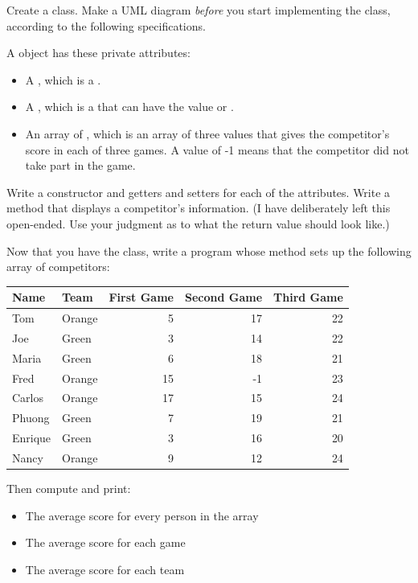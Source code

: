 \begin{exercise}
Create a  class. Make a UML diagram {\em before} you start implementing the class, according to the following specifications.

A  object has these private attributes:

\begin{itemize}
\item A , which is a .
\item A , which is a  that can have the value  or .
\item An array of , which is an array of three  values that gives the competitor's score in each of three games. A value of -1 means that the competitor did not take part in the game.
\end{itemize}

Write a constructor and getters and setters for each of the attributes. Write a  method that displays a competitor's information. (I have deliberately left this open-ended. Use your judgment as to what the return value should look like.)

Now that you have the  class, write a program whose  method sets up the following array of competitors:

\begin{tabular}{|l|l|r|r|r|}
\hline
Name & Team & First Game & Second Game & Third Game \\ \hline
Tom & Orange & 5 & 17 & 22 \\ \hline
Joe & Green & 3 & 14 & 22 \\ \hline
Maria & Green & 6 & 18 & 21 \\ \hline
Fred & Orange & 15 & -1 & 23 \\ \hline
Carlos & Orange & 17 & 15 & 24 \\ \hline
Phuong & Green & 7 & 19 & 21 \\ \hline
Enrique & Green & 3 & 16 & 20 \\ \hline
Nancy & Orange & 9 & 12 & 24 \\ \hline
\end{tabular}

Then compute and print:

\begin{itemize}
\item The average score for every person in the array
\item The average score for each game
\item The average score for each team
\end{itemize}

\end{exercise}

